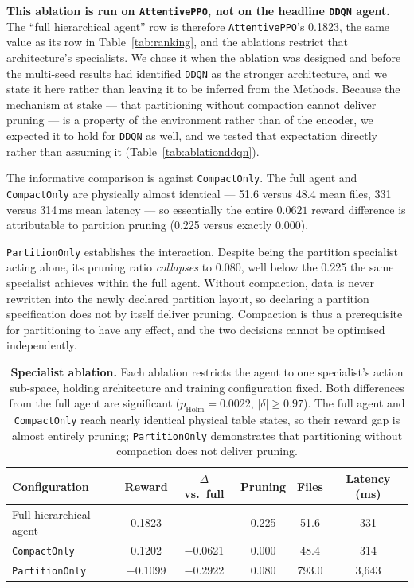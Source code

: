 \documentclass[fleqn,10pt]{wlscirep}
\newcommand{\attentive}{\texttt{AttentivePPO}}
\newcommand{\ddqn}{\texttt{DDQN}}
\begin{document}
\textbf{This ablation is run on \attentive{}, not on the headline
\ddqn{} agent.} The ``full hierarchical agent'' row is therefore
\attentive{}'s 0.1823, the same value as its row in
Table~\ref{tab:ranking}, and the ablations restrict that architecture's
specialists. We chose it when the ablation was designed and before the
multi-seed results had identified \ddqn{} as the stronger architecture,
and we state it here rather than leaving it to be inferred from the
Methods. Because the mechanism at stake --- that partitioning without
compaction cannot deliver pruning --- is a property of the environment
rather than of the encoder, we expected it to hold for \ddqn{} as well,
and we tested that expectation directly rather than assuming it
(Table~\ref{tab:ablationddqn}).

The informative comparison is against \texttt{CompactOnly}. The full
agent and \texttt{CompactOnly} are physically almost identical --- 51.6
versus 48.4 mean files, 331 versus 314\,ms mean latency --- so
essentially the entire $0.0621$ reward difference is attributable to
partition pruning (0.225 versus exactly 0.000).

\texttt{PartitionOnly} establishes the interaction. Despite being the
partition specialist acting alone, its pruning ratio \emph{collapses} to
0.080, well below the 0.225 the same specialist achieves within the full
agent. Without compaction, data is never rewritten into the newly
declared partition layout, so declaring a partition specification does
not by itself deliver pruning. Compaction is thus a prerequisite for
partitioning to have any effect, and the two decisions cannot be
optimised independently.

\begin{table}[!htbp]
\centering
\begin{tabular}{lccccc}
\toprule
\textbf{Configuration} & \textbf{Reward} & $\Delta$ \textbf{vs.\ full} &
  \textbf{Pruning} & \textbf{Files} & \textbf{Latency (ms)} \\
\midrule
Full hierarchical agent    & 0.1823    & ---       & 0.225 & 51.6  & 331 \\
\texttt{CompactOnly}       & 0.1202    & $-$0.0621 & 0.000 & 48.4  & 314 \\
\texttt{PartitionOnly}     & $-$0.1099 & $-$0.2922 & 0.080 & 793.0 & 3{,}643 \\
\bottomrule
\end{tabular}
\caption{\label{tab:ablation}\textbf{Specialist ablation.}
  Each ablation restricts the agent to one specialist's action
  sub-space, holding architecture and training configuration fixed.
  Both differences from the full agent are significant
  ($p_{\text{Holm}} = 0.0022$, $|\delta| \geq 0.97$). The full agent and
  \texttt{CompactOnly} reach nearly identical physical table states, so
  their reward gap is almost entirely pruning; \texttt{PartitionOnly}
  demonstrates that partitioning without compaction does not deliver
  pruning.}
\end{table}
\end{document}
